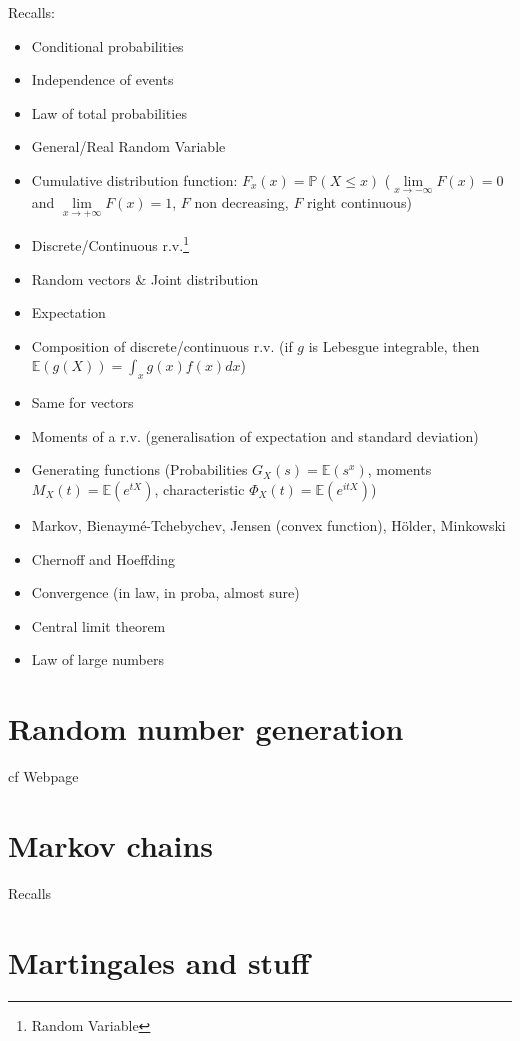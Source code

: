 \documentclass{article}
\begin{document}
\bigskip
Recalls:
\begin{itemize}
\item Conditional probabilities
\item Independence of events
\item Law of total probabilities
\item General/Real Random Variable
\item Cumulative distribution function: $F_x(x)=\mathbb{P}(X\leq x)$ ($\lim\limits_{x\to -\infty} F(x) = 0$ and $\lim\limits_{x\to +\infty} F(x) = 1$, $F$ non decreasing, $F$ right continuous)
\item Discrete/Continuous r.v.\footnote{Random Variable}
\item Random vectors \& Joint distribution
\item Expectation
\item Composition of discrete/continuous r.v. (if $g$ is Lebesgue integrable, then $\mathbb{E}(g(X))=\int_x g(x)f(x)dx$)
\item Same for vectors
\item Moments of a r.v. (generalisation of expectation and standard deviation)
\item Generating functions (Probabilities $G_X(s)=\mathbb{E}(s^x)$, moments $M_X(t)=\mathbb{E}(e^{tX})$, characteristic $\Phi_X(t)=\mathbb{E}(e^{itX})$)
\item Markov, Bienaymé-Tchebychev, Jensen (convex function), Hölder, Minkowski
\item Chernoff and Hoeffding
\item Convergence (in law, in proba, almost sure)
\item Central limit theorem
\item Law of large numbers
\end{itemize}

\section{Random number generation}
cf Webpage


\section{Markov chains}
Recalls

\section{Martingales and stuff}
\end{document}
